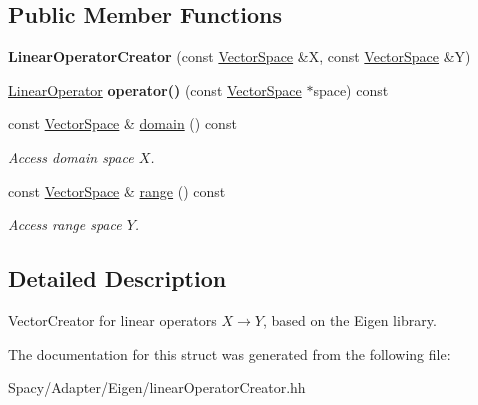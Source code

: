 \subsection*{Public Member Functions}
\begin{DoxyCompactItemize}
\item 
\hypertarget{structSpacy_1_1Rn_1_1LinearOperatorCreator_a7f00b9a6f0f656d756a65d42803e3620}{}{\bfseries Linear\+Operator\+Creator} (const \hyperlink{classSpacy_1_1VectorSpace}{Vector\+Space} \&X, const \hyperlink{classSpacy_1_1VectorSpace}{Vector\+Space} \&Y)\label{structSpacy_1_1Rn_1_1LinearOperatorCreator_a7f00b9a6f0f656d756a65d42803e3620}

\item 
\hypertarget{classSpacy_1_1Generic_1_1LinearOperatorCreator_a34e9eee442ba1bffeab9905266500bf6}{}\hyperlink{classSpacy_1_1Rn_1_1LinearOperator}{Linear\+Operator} {\bfseries operator()} (const \hyperlink{classSpacy_1_1VectorSpace}{Vector\+Space} $\ast$space) const \label{classSpacy_1_1Generic_1_1LinearOperatorCreator_a34e9eee442ba1bffeab9905266500bf6}

\item 
\hypertarget{classSpacy_1_1OperatorBase_a2588f9b3e0188820c4c494e63293dc6f}{}const \hyperlink{classSpacy_1_1VectorSpace}{Vector\+Space} \& \hyperlink{classSpacy_1_1OperatorBase_a2588f9b3e0188820c4c494e63293dc6f}{domain} () const \label{classSpacy_1_1OperatorBase_a2588f9b3e0188820c4c494e63293dc6f}

\begin{DoxyCompactList}\small\item\em Access domain space $X$. \end{DoxyCompactList}\item 
\hypertarget{classSpacy_1_1OperatorBase_ab19d3b7a6f290b1079248f1e567e53d6}{}const \hyperlink{classSpacy_1_1VectorSpace}{Vector\+Space} \& \hyperlink{classSpacy_1_1OperatorBase_ab19d3b7a6f290b1079248f1e567e53d6}{range} () const \label{classSpacy_1_1OperatorBase_ab19d3b7a6f290b1079248f1e567e53d6}

\begin{DoxyCompactList}\small\item\em Access range space $Y$. \end{DoxyCompactList}\end{DoxyCompactItemize}


\subsection{Detailed Description}
Vector\+Creator for linear operators $X\rightarrow Y$, based on the Eigen library. 

The documentation for this struct was generated from the following file\+:\begin{DoxyCompactItemize}
\item 
Spacy/\+Adapter/\+Eigen/linear\+Operator\+Creator.\+hh\end{DoxyCompactItemize}
